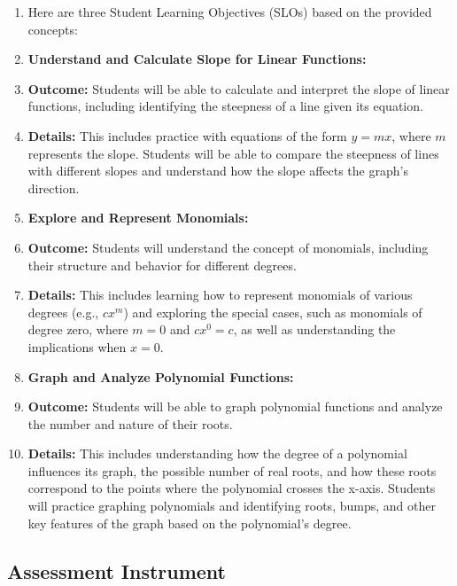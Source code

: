 \begin{enumerate}
    \item Here are three Student Learning Objectives (SLOs) based on the provided concepts:
    \item \textbf{Understand and Calculate Slope for Linear Functions:}
    \item \textbf{Outcome:} Students will be able to calculate and interpret the slope of linear functions, including identifying the steepness of a line given its equation.
    \item \textbf{Details:} This includes practice with equations of the form \(y = mx\), where \(m\) represents the slope. Students will be able to compare the steepness of lines with different slopes and understand how the slope affects the graph's direction.
    \item \textbf{Explore and Represent Monomials:}
    \item \textbf{Outcome:} Students will understand the concept of monomials, including their structure and behavior for different degrees.
    \item \textbf{Details:} This includes learning how to represent monomials of various degrees (e.g., \(cx^m\)) and exploring the special cases, such as monomials of degree zero, where \(m=0\) and \(cx^0 = c\), as well as understanding the implications when \(x=0\).
    \item \textbf{Graph and Analyze Polynomial Functions:}
    \item \textbf{Outcome:} Students will be able to graph polynomial functions and analyze the number and nature of their roots.
    \item \textbf{Details:} This includes understanding how the degree of a polynomial influences its graph, the possible number of real roots, and how these roots correspond to the points where the polynomial crosses the x-axis. Students will practice graphing polynomials and identifying roots, bumps, and other key features of the graph based on the polynomial's degree.
\end{enumerate}


\subsection{Assessment Instrument}
\label{ssec:asse-3669}


